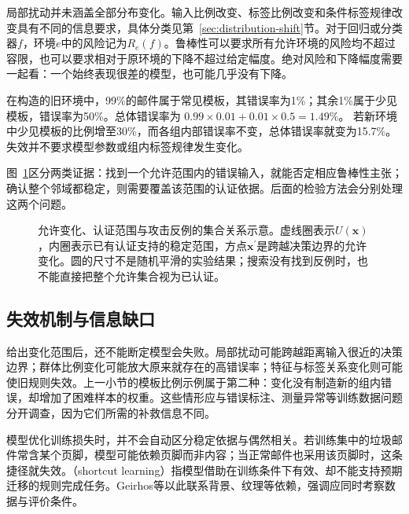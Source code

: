局部扰动并未涵盖全部分布变化。输入比例改变、标签比例改变和条件标签规律改变具有不同的信息要求，具体分类见第~\ref{sec:distribution-shift}节。对于回归或分类器$f$，环境$e$中的风险记为$R_e(f)$。鲁棒性可以要求所有允许环境的风险均不超过容限，也可以要求相对于原环境的下降不超过给定幅度。绝对风险和下降幅度需要一起看：一个始终表现很差的模型，也可能几乎没有下降。

\begin{example}[总体表现掩盖群体脆弱性]
\label{ex:robustness-mixture}
在构造的旧环境中，99\%的邮件属于常见模板，其错误率为1\%；其余1\%属于少见模板，错误率为50\%。总体错误率为
$0.99\times0.01+0.01\times0.5=1.49\%$。
若新环境中少见模板的比例增至30\%，而各组内部错误率不变，总体错误率就变为15.7\%。失效并不要求模型参数或组内标签规律发生变化。
\end{example}

图~\ref{fig:trust-robust-neighborhood}区分两类证据：找到一个允许范围内的错误输入，就能否定相应鲁棒性主张；确认整个邻域都稳定，则需要覆盖该范围的认证依据。后面的检验方法会分别处理这两个问题。

\begin{figure}[!htb]
  \centering
  
  \caption{允许变化、认证范围与攻击反例的集合关系示意。虚线圈表示$U(\bm x)$，内圈表示已有认证支持的稳定范围，方点$\bm x^{\prime}$是跨越决策边界的允许变化。圆的尺寸不是随机平滑的实验结果；搜索没有找到反例时，也不能直接把整个允许集合视为已认证。}
  \label{fig:trust-robust-neighborhood}
\end{figure}

\subsection{失效机制与信息缺口}
\label{sec:robustness-failure-mechanisms}

给出变化范围后，还不能断定模型会失败。局部扰动可能跨越距离输入很近的决策边界；群体比例变化可能放大原来就存在的高错误率；特征与标签关系变化则可能使旧规则失效。上一小节的模板比例示例属于第二种：变化没有制造新的组内错误，却增加了困难样本的权重。这些情形应与错误标注、测量异常等训练数据问题分开调查，因为它们所需的补救信息不同。

模型优化训练损失时，并不会自动区分稳定依据与偶然相关。若训练集中的垃圾邮件常含某个页脚，模型可能依赖页脚而非内容；当正常邮件也采用该页脚时，这条捷径就失效。（shortcut learning）指模型借助在训练条件下有效、却不能支持预期迁移的规则完成任务。Geirhos等以此联系背景、纹理等依赖，强调应同时考察数据与评价条件。

